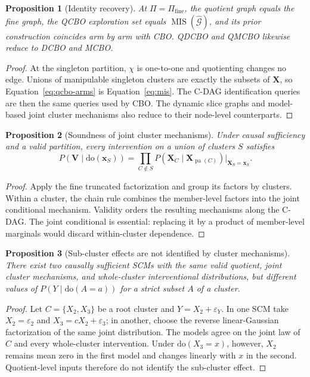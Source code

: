 \documentclass[twoside]{article}
\newtheorem{proposition}{Proposition}
\newcommand{\doo}{\mathrm{do}}
\newcommand{\Gg}{\mathcal{G}}
\begin{document}
\begin{proposition}[Identity recovery]
\label{prop:identity}
At \(\Pi=\Pi_{\mathrm{fine}}\), the quotient graph equals the fine graph, the QCBO exploration set equals \(\operatorname{MIS}(\widehat{\Gg})\), and its prior construction coincides arm by arm with CBO. QDCBO and QMCBO likewise reduce to DCBO and MCBO.
\end{proposition}

\begin{proof}
At the singleton partition, \(\chi\) is one-to-one and quotienting changes no edge. Unions of manipulable singleton clusters are exactly the subsets of \(\mathbf X\), so Equation~\eqref{eq:qcbo-arms} is Equation~\eqref{eq:mis}. The C-DAG identification queries are then the same queries used by CBO. The dynamic slice graphs and model-based joint cluster mechanisms also reduce to their node-level counterparts.
\end{proof}

\begin{proposition}[Soundness of joint cluster mechanisms]
\label{prop:cluster-soundness}
Under causal sufficiency and a valid partition, every intervention on a union of clusters \(S\) satisfies
\[
 P(\mathbf V\mid\doo(\mathbf x_S))
 =\prod_{C\notin S}
 P(\mathbf X_C\mid\mathbf X_{\operatorname{pa}(C)})
 \big|_{\mathbf X_S=\mathbf x_S}.
\]
\end{proposition}

\begin{proof}
Apply the fine truncated factorization and group its factors by clusters. Within a cluster, the chain rule combines the member-level factors into the joint conditional mechanism. Validity orders the resulting mechanisms along the C-DAG. The joint conditional is essential: replacing it by a product of member-level marginals would discard within-cluster dependence.
\end{proof}

\begin{proposition}[Sub-cluster effects are not identified by cluster mechanisms]
\label{prop:qexposure}
There exist two causally sufficient SCMs with the same valid quotient, joint cluster mechanisms, and whole-cluster interventional distributions, but different values of \(P(Y\mid\doo(A=a))\) for a strict subset \(A\) of a cluster.
\end{proposition}

\begin{proof}
Let \(C=\{X_2,X_3\}\) be a root cluster and \(Y=X_2+\varepsilon_Y\). In one SCM take \(X_2=\varepsilon_2\) and \(X_3=cX_2+\varepsilon_3\); in another, choose the reverse linear-Gaussian factorization of the same joint distribution. The models agree on the joint law of \(C\) and every whole-cluster intervention. Under \(\doo(X_3=x)\), however, \(X_2\) remains mean zero in the first model and changes linearly with \(x\) in the second. Quotient-level inputs therefore do not identify the sub-cluster effect.
\end{proof}
\end{document}
